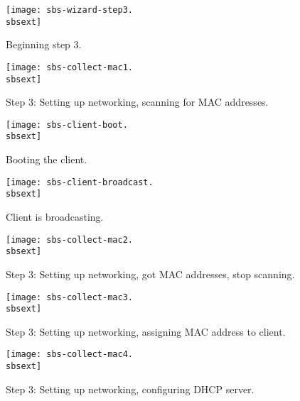 \begin{figure}[htbp]
  \begin{center}
    \texttt{[image: sbs-wizard-step3.\\sbsext]}
    \caption{Beginning step 3.}
    \label{fig:sbs-install-wizard-s3}
  \end{center}
\end{figure}

\begin{figure}[htbp]
  \begin{center}
    \texttt{[image: sbs-collect-mac1.\\sbsext]}
    \caption{Step 3: Setting up networking, scanning for MAC addresses.}
    \label{fig:sbs-setup-network1}
  \end{center}
\end{figure}

\begin{figure}[htbp]
  \begin{center}
    \texttt{[image: sbs-client-boot.\\sbsext]}
    \caption{Booting the client.}
    \label{fig:sbs-collect-boot}
  \end{center}
\end{figure}

\begin{figure}[htbp]
  \begin{center}
    \texttt{[image: sbs-client-broadcast.\\sbsext]}
    \caption{Client is broadcasting.}
    \label{fig:sbs-collect-broadcast}
  \end{center}
\end{figure}

\begin{figure}[htbp]
  \begin{center}
    \texttt{[image: sbs-collect-mac2.\\sbsext]}
    \caption{Step 3: Setting up networking, got MAC addresses, stop scanning.}
    \label{fig:sbs-setup-network2}
  \end{center}
\end{figure}

\begin{figure}[htbp]
  \begin{center}
    \texttt{[image: sbs-collect-mac3.\\sbsext]}
    \caption{Step 3: Setting up networking, assigning MAC address to client.}
    \label{fig:sbs-setup-network3}
  \end{center}
\end{figure}

\begin{figure}[htbp]
  \begin{center}
    \texttt{[image: sbs-collect-mac4.\\sbsext]}
    \caption{Step 3: Setting up networking, configuring DHCP server.}
    \label{fig:sbs-setup-network4}
  \end{center}
\end{figure}



